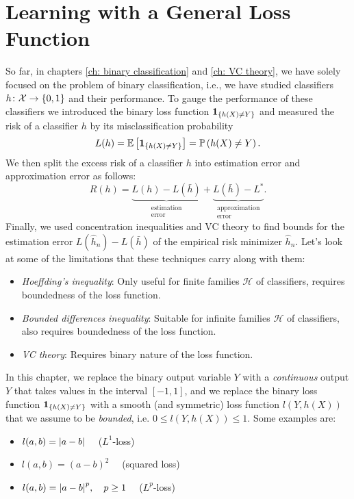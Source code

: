 \chapter{Learning with a General Loss Function}

So far, in chapters \ref{ch: binary classification} and \ref{ch: VC theory}, we have solely focused on the problem of binary classification, i.e., we have studied classifiers $h \colon \mathcal{X} \to \left\{0, 1\right\}$ and their performance. To gauge the performance of these classifiers we introduced the binary loss function $\mathbf{1}_{\left\{h(X) \neq Y\right\}}$ and measured the risk of a classifier $h$ by its misclassification probability
\[
    L(h) = \mathbb{E}\left[\mathbf{1}_{\left\{h(X) \neq Y\right\}}\right] = \mathbb{P}\left(h(X) \neq Y\right).
\]
We then split the excess risk of a classifier $h$ into estimation error and approximation error as follows:
\[
    R(h) = \underbrace{L(h) - L(\bar h)}_{\substack{\text{estimation} \\ \text{error}}} + \underbrace{L(\bar h) - L^*}_{\substack{\text{approximation} \\ \text{error}}}.
\]
Finally, we used concentration inequalities and VC theory to find bounds for the estimation error $L(\hat h_n) - L(\bar h)$ of the empirical risk minimizer $\hat h_n$. Let's look at some of the limitations that these techniques carry along with them:

\begin{itemize}
    \item \emph{Hoeffding's inequality}: Only useful for finite families $\mathcal{H}$ of classifiers, requires boundedness of the loss function.

    \item \emph{Bounded differences inequality}: Suitable for infinite families $\mathcal{H}$ of classifiers, also requires boundedness of the loss function.

    \item \emph{VC theory}: Requires binary nature of the loss function.
\end{itemize}

In this chapter, we replace the binary output variable $Y$ with a \emph{continuous} output $Y$ that takes values in the interval $[-1, 1]$, and we replace the binary loss function $\mathbf{1}_{\left\{h(X) \neq Y\right\}}$ with a smooth (and symmetric) loss function $l(Y, h(X))$ that we assume to be \emph{bounded}, i.e. $0 \leq l(Y, h(X)) \leq 1$. Some examples are:

\begin{itemize}
    \item $l(a, b) = \abs{a - b} \quad$ ($L^1$-loss)
    
    \item $l(a, b) = (a - b)^2 \quad$ (squared loss)

    \item $l(a, b) = \abs{a - b}^p, \quad p \geq 1 \quad$ ($L^p$-loss)
\end{itemize}

